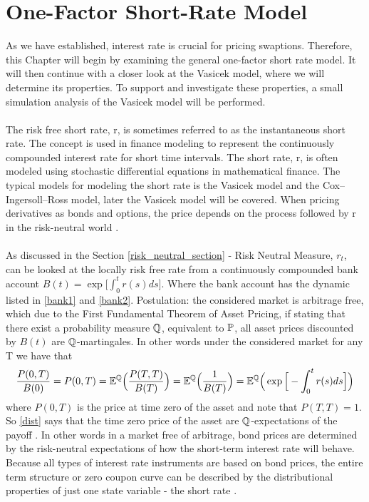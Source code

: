 \section{One-Factor Short-Rate Model}
As we have established, interest rate is crucial 
for pricing swaptions. Therefore, this Chapter will 
begin by examining the general one-factor short rate 
model. It will then continue with a closer look at the 
Vasicek model, where we will determine its properties. 
To support and investigate these properties, a small 
simulation analysis of the Vasicek model will be 
performed.
\\\\
The risk free short rate, r, is sometimes referred to as the instantaneous short rate. 
The concept is used in finance modeling to represent the continuously compounded interest rate for 
short time intervals. The short rate, r, is often modeled using stochastic differential equations in 
mathematical finance. The typical models for modeling the short rate is the Vasicek model and the Cox–Ingersoll–Ross model, 
later the Vasicek model will be covered. When pricing derivatives as bonds and options, the price depends on 
the process followed by r in the risk-neutral world \cite{Hull}.
\\\\
As discussed in the Section \ref{risk_neutral_section} - Risk Neutral Measure, $r_t$, can be looked at the locally risk free 
rate from a continuously compounded bank account $B(t)= \exp \Big[\int_{0}^{t} r(s) ds \Big]$. 
Where the bank account has the dynamic listed in \autoref{bank1} and \autoref{bank2}.
Postulation: the considered market is arbitrage free, which due to the First Fundamental Theorem of Asset Pricing, 
if stating that there exist a probability measure $\mathbb{Q}$, equivalent to $\mathbb{P}$, all asset prices discounted by $B(t)$
are $\mathbb{Q}$-martingales. In other words under the considered market for any T we have that 
\begin{align}
    \frac{P(0,T)}{B(0)} = P(0,T) = \mathbb{E}^{\mathbb{Q}} \Big( \frac{P(T,T)}{B(T)}\Big) = \mathbb{E}^{\mathbb{Q}} \Big( \frac{1}{B(T)}\Big) 
    = \mathbb{E}^{\mathbb{Q}} \Big( \exp \Big[ - \int_{0}^{t}r(s)ds \Big] \Big)
    \label{dist}
\end{align}
where $P(0,T)$ is the price at time zero of the asset and note that $P(T,T)=1$. So \autoref{dist} says that 
the time zero price of the asset are $\mathbb{Q}$-expectations  of the payoff \cite{Bermudan}.
In other words in a market free of arbitrage, bond prices are determined by the risk-neutral expectations 
of how the short-term interest rate will behave. Because all types of interest rate instruments are based
on bond prices, the entire term structure or zero coupon curve can be described by the distributional properties
of just one state variable - the short rate \cite{Bermudan}.

